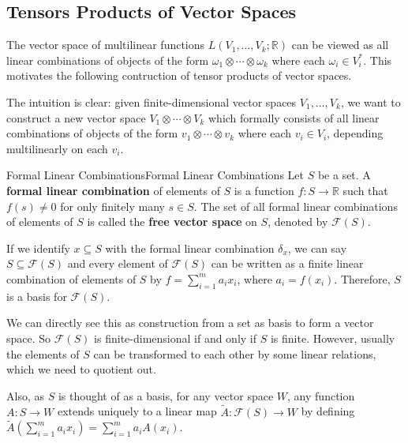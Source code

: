 \documentclass[../main.tex]{subfiles}
\begin{document}
\subsection{Tensors Products of Vector Spaces}
The vector space of multilinear functions $L(V_1, \ldots, V_k; \mathbb{R})$ can be viewed as all linear combinations of objects of the form $\omega_1 \otimes \cdots \otimes \omega_k$ where each $\omega_i \in V_i^*$. This motivates the following contruction of tensor products of vector spaces.

The intuition is clear: given finite-dimensional vector spaces $V_1, \ldots, V_k$, we want to construct a new vector space $V_1 \otimes \cdots \otimes V_k$ which formally consists of all linear combinations of objects of the form $v_1 \otimes \cdots \otimes v_k$ where each $v_i \in V_i$, depending multilinearly on each $v_i$.

\begin{definition}{Formal Linear Combinations}{Formal Linear Combinations}
  Let $S$ be a set. A \textbf{formal linear combination} of elements of $S$ is a function $f: S \to \mathbb{R}$ such that $f(s) \neq 0$ for only finitely many $s \in S$. The set of all formal linear combinations of elements of $S$ is called the \textbf{free vector space} on $S$, denoted by $\mathcal{F}(S)$.

  If we identify $x \subseteq S$ with the formal linear combination $\delta_x$, we can say $S \subseteq \mathcal{F}(S)$ and every element of $\mathcal{F}(S)$ can be written as a finite linear combination of elements of $S$ by $f = \sum_{i = 1}^m a_i x_i$, where $a_i = f(x_i)$. Therefore, $S$ is a basis for $\mathcal{F}(S)$.
\end{definition}
We can directly see this as construction from a set as basis to form a vector space. So $\mathcal{F}(S)$ is finite-dimensional if and only if $S$ is finite. However, usually the elements of $S$ can be transformed to each other by some linear relations, which we need to quotient out.

Also, as $S$ is thought of as a basis, for any vector space $W$, any function $A: S \to W$ extends uniquely to a linear map $\tilde{A}: \mathcal{F}(S) \to W$ by defining $\tilde{A}(\sum_{i = 1}^m a_i x_i) = \sum_{i = 1}^m a_i A(x_i)$.
\end{document}
